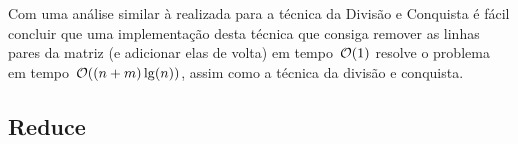 Com uma análise similar à realizada para a técnica da Divisão e Conquista é fácil concluir que uma implementação desta técnica que consiga remover as linhas pares da matriz (e adicionar elas de volta) em tempo~$\mathcal{O}(1)$ resolve o problema em tempo~$\mathcal{O}((n+m)\lg(n))$, assim como a técnica da divisão e conquista.  

\subsection{Reduce}


